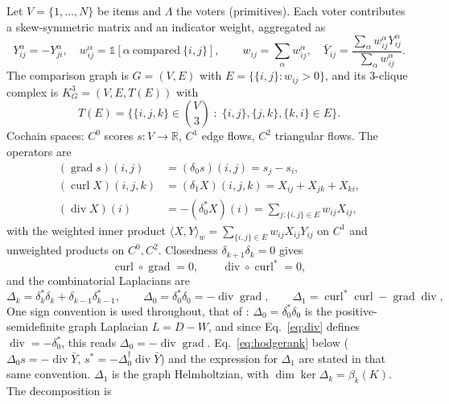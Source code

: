 \documentclass[11pt,a4paper]{article}
\theoremstyle{plain}
\theoremstyle{remark}
\theoremstyle{plain}
\begin{document}
Let $V=\{1,\dots,N\}$ be items and $\Lambda$ the voters (primitives). Each voter contributes a skew-symmetric matrix and an indicator weight, aggregated as
\begin{equation}
Y^{\alpha}_{ij}=-Y^{\alpha}_{ji},\quad w^{\alpha}_{ij}=\mathbb{1}[\alpha\ \text{compared}\ \{i,j\}],\qquad
w_{ij}=\sum_\alpha w^\alpha_{ij},\quad
\bar Y_{ij}=\frac{\sum_\alpha w^\alpha_{ij}Y^\alpha_{ij}}{\sum_\alpha w^\alpha_{ij}} .
\label{eq:hodge-agg}
\end{equation}
The comparison graph is $G=(V,E)$ with $E=\{\{i,j\}:w_{ij}>0\}$, and its $3$-clique complex is $K_G^3=(V,E,T(E))$ with
\begin{equation}
T(E)=\Big\{\{i,j,k\}\in\binom{V}{3}\;:\;\{i,j\},\{j,k\},\{k,i\}\in E\Big\}.
\label{eq:cliquecomplex}
\end{equation}
Cochain spaces: $C^0$ scores $s:V\to\mathbb{R}$, $C^1$ edge flows, $C^2$ triangular flows. The operators are
\begin{align}
(\operatorname{grad}s)(i,j) &= (\delta_0s)(i,j)=s_j-s_i, \label{eq:grad}\\
(\operatorname{curl}X)(i,j,k) &= (\delta_1X)(i,j,k)=X_{ij}+X_{jk}+X_{ki}, \label{eq:curl}\\
(\operatorname{div}X)(i) &= -(\delta_0^{*}X)(i)=\sum_{j:\{i,j\}\in E}w_{ij}X_{ij}, \label{eq:div}
\end{align}
with the weighted inner product $\langle X,Y\rangle_w=\sum_{\{i,j\}\in E}w_{ij}X_{ij}Y_{ij}$ on $C^1$ and unweighted products on $C^0,C^2$. Closedness $\delta_{k+1}\delta_k=0$ gives
\begin{equation}
\operatorname{curl}\circ\operatorname{grad}=0,\qquad \operatorname{div}\circ\operatorname{curl}^{*}=0,
\label{eq:closedness}
\end{equation}
and the combinatorial Laplacians are
\begin{equation}
\Delta_k=\delta_k^{*}\delta_k+\delta_{k-1}\delta_{k-1}^{*},\qquad
\Delta_0=\delta_0^{*}\delta_0=-\operatorname{div}\operatorname{grad},\qquad
\Delta_1=\operatorname{curl}^{*}\operatorname{curl}-\operatorname{grad}\operatorname{div},
\label{eq:laplacians}
\end{equation}
One sign convention is used throughout, that of \citet{jlyy2011}: $\Delta_0=\delta_0^{*}\delta_0$ is the positive-semidefinite graph Laplacian $L=D-W$, and since Eq.~\eqref{eq:div} defines $\operatorname{div}=-\delta_0^{*}$, this reads $\Delta_0=-\operatorname{div}\operatorname{grad}$. Eq.~\eqref{eq:hodgerank} below ($\Delta_0s=-\operatorname{div}\bar Y$, $s^{*}=-\Delta_0^{\dagger}\operatorname{div}\bar Y$) and the expression for $\Delta_1$ are stated in that same convention. $\Delta_1$ is the graph Helmholtzian, with $\dim\ker\Delta_k=\beta_k(K)$. The decomposition is
\end{document}
